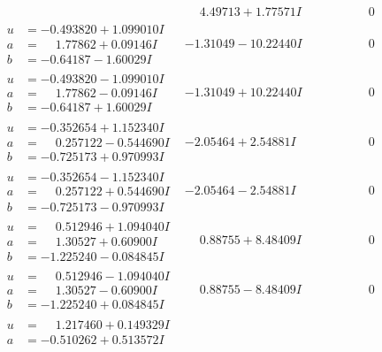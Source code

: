 \documentclass[1p]{elsarticle_modified}
\theoremstyle{definition}
\begin{document}
$$\begin{array}{c|c|c}
 & \phantom{-}4.49713 + 1.77571 I & \phantom{-0.000000 } 0 \\ \hline\begin{aligned}
u &= -0.493820 + 1.099010 I \\
a &= \phantom{-}1.77862 + 0.09146 I \\
b &= -0.64187 - 1.60029 I\end{aligned}
 & -1.31049 - 10.22440 I & \phantom{-0.000000 } 0 \\ \hline\begin{aligned}
u &= -0.493820 - 1.099010 I \\
a &= \phantom{-}1.77862 - 0.09146 I \\
b &= -0.64187 + 1.60029 I\end{aligned}
 & -1.31049 + 10.22440 I & \phantom{-0.000000 } 0 \\ \hline\begin{aligned}
u &= -0.352654 + 1.152340 I \\
a &= \phantom{-}0.257122 - 0.544690 I \\
b &= -0.725173 + 0.970993 I\end{aligned}
 & -2.05464 + 2.54881 I & \phantom{-0.000000 } 0 \\ \hline\begin{aligned}
u &= -0.352654 - 1.152340 I \\
a &= \phantom{-}0.257122 + 0.544690 I \\
b &= -0.725173 - 0.970993 I\end{aligned}
 & -2.05464 - 2.54881 I & \phantom{-0.000000 } 0 \\ \hline\begin{aligned}
u &= \phantom{-}0.512946 + 1.094040 I \\
a &= \phantom{-}1.30527 + 0.60900 I \\
b &= -1.225240 - 0.084845 I\end{aligned}
 & \phantom{-}0.88755 + 8.48409 I & \phantom{-0.000000 } 0 \\ \hline\begin{aligned}
u &= \phantom{-}0.512946 - 1.094040 I \\
a &= \phantom{-}1.30527 - 0.60900 I \\
b &= -1.225240 + 0.084845 I\end{aligned}
 & \phantom{-}0.88755 - 8.48409 I & \phantom{-0.000000 } 0 \\ \hline\begin{aligned}
u &= \phantom{-}1.217460 + 0.149329 I \\
a &= -0.510262 + 0.513572 I \\

\end{aligned}
\end{array}$$
\end{document}

